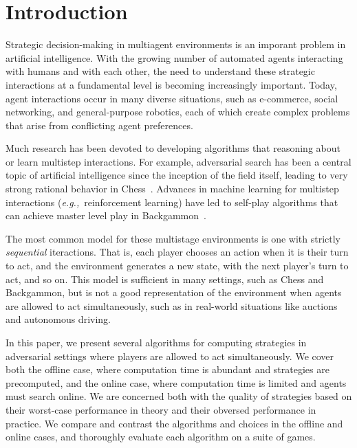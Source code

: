 \documentclass[preprint,12pt]{elsarticle}
\newcommand{\eg}{{\it e.g.,}~}
\begin{document}

\section{Introduction}
\label{sec:intro}

Strategic decision-making in multiagent environments is an imporant problem in artificial intelligence. 
With the growing number of automated agents interacting with humans and with each other, the need to 
understand these strategic interactions at a fundamental level is becoming increasingly important. 
Today, agent interactions occur in many diverse situations, such as e-commerce, social networking, and 
general-purpose robotics, each of which create complex problems that arise from conflicting agent 
preferences. 

Much research has been devoted to developing algorithms that reasoning about or learn multistep 
interactions. For example, adversarial search has been a central topic of artificial intelligence 
since the inception of the field itself, leading to very strong rational behavior in 
Chess~\cite{Campbell02deepblue}. Advances in machine learning for multistep interactions 
(\eg reinforcement learning) have led to self-play algorithms that can achieve master level play 
in Backgammon~\cite{Tesauro95TDGammon}. 

The most common model for these multistage environments is one with strictly {\it sequential} 
iteractions. That is, each player chooses an action when it is their turn to act, and the environment 
generates a new state, with the next player's turn to act, and so on. This model is sufficient in many 
settings, such as Chess and Backgammon, but is not a good representation of the environment when agents 
are allowed to act simultaneously, such as in real-world situations like auctions and autonomous driving. 

In this paper, we present several algorithms for computing strategies in adversarial settings where
players are allowed to act simultaneously. We cover both the offline case, where computation time is 
abundant and strategies are precomputed, and the online case, where computation time is limited and 
agents must search online. We are concerned both with the quality of strategies based on 
their worst-case performance in theory and their obversed performance in practice. We compare and 
contrast the algorithms and choices in the offline and online cases, and thoroughly evaluate each 
algorithm on a suite of games. 
\end{document}
